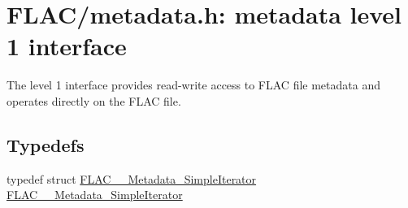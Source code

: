 \hypertarget{group__flac__metadata__level1}{}\section{F\+L\+A\+C/metadata.h\+: metadata level 1 interface}
\label{group__flac__metadata__level1}


The level 1 interface provides read-\/write access to F\+L\+AC file metadata and operates directly on the F\+L\+AC file.  


\subsection*{Typedefs}
\begin{DoxyCompactItemize}
\item 
typedef struct \mbox{\hyperlink{group__flac__metadata__level1_ga6accccddbb867dfc2eece9ee3ffecb3a}{F\+L\+A\+C\+\_\+\+\_\+\+Metadata\+\_\+\+Simple\+Iterator}} \mbox{\hyperlink{group__flac__metadata__level1_ga6accccddbb867dfc2eece9ee3ffecb3a}{F\+L\+A\+C\+\_\+\+\_\+\+Metadata\+\_\+\+Simple\+Iterator}}
\end{DoxyCompactItemize}
